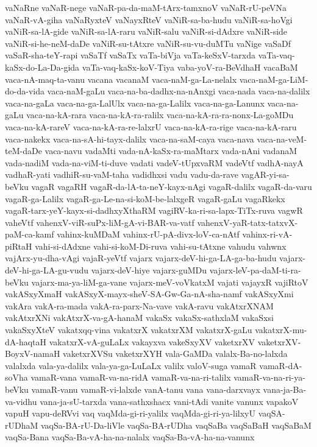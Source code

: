 {vaNaRne
vaNaR-nege
vaNaR-pa-da-maM-tArx-tamxnoV
vaNaR-rU-peVNa
vaNaR-vA-giha
vaNaRyxteV
vaNayxRteV
vaNiR-sa-ba-hudu
vaNiR-sa-hoVgi
vaNiR-sa-lA-gide
vaNiR-sa-lA-raru
vaNiR-salu
vaNiR-si-dAdxre
vaNiR-side
vaNiR-si-he-neM-daDe
vaNiR-su-tAtxre
vaNiR-su-vu-duMTu
vaNige
vaSaDf
vaSaR-sha-teY-rapi
vaSaTf
vaSaTx
vaTa-biVja
vaTa-keSxV-tarxda
vaTa-vaq-kaSx-do-La-Da-gida
vaTa-vaq-kaSx-koV-Tiya
vaba-yoV-ra-BeVdhaH
vacaBaM
vaca-nA-maq-ta-vanu
vacana
vacanaM
vaca-naM-ga-La-nelalx
vaca-naM-ga-LiM-do-da-vida
vaca-naM-gaLu
vaca-na-ba-dadhx-na-nAnxgi
vaca-nada
vaca-na-dalilx
vaca-na-gaLa
vaca-na-ga-LalUlx
vaca-na-ga-Lalilx
vaca-na-ga-Lanunx
vaca-na-gaLu
vaca-na-kA-rara
vaca-na-kA-ra-ralilx
vaca-na-kA-ra-ra-nonx-La-goMDu
vaca-na-kA-rareV
vaca-na-kA-ra-re-lalxrU
vaca-na-kA-ra-rige
vaca-na-kA-raru
vaca-nakekx
vaca-na-sA-hi-tayx-dalilx
vaca-na-saM-caya
vaca-nava
vaca-na-veM-teM-daDe
vaca-navu
vadaMti
vada-nA-kaSx-ra-maMtarx
vada-nAni
vadanaM
vada-nadiM
vada-na-viM-ti-duve
vadati
vadeV-tUpxvaRM
vadeVtf
vadhA-nayA
vadhaR-yati
vadhiR-su-vaM-taha
vadidhxsi
vadu
vadu-da-rave
vagAR-yi-sa-beVku
vagaR
vagaRH
vagaR-da-lA-ta-neY-kayx-nAgi
vagaR-dalilx
vagaR-da-varu
vagaR-ga-Lalilx
vagaR-ga-Le-na-si-koM-be-lalxgeR
vagaR-gaLu
vagaRkekx
vagaR-tarx-yeY-kayx-si-dadhxyXthaRM
vagiRV-ka-ri-sa-lapx-TiTx-ruva
vagwR
vaheVtf
vahenxV-viR-suPx-liM-gA-vi-BAR-va-vatf
vahenxV-yaR-tatx-tatxvX-paM-ca-kamf
vahinx-kuMDaM
vahinx-rU-pA-divx-loV-ca-nAtf
vahinx-ri-vA-piRtaH
vahi-si-dAdxne
vahi-si-koM-Di-ruva
vahi-su-tAtxne
vahudu
vahwnx
vajArx-yu-dha-vAgi
vajaR-yeVtf
vajarx
vajarx-deV-hi-ga-LA-ga-ba-hudu
vajarx-deV-hi-ga-LA-gu-vudu
vajarx-deV-hiye
vajarx-guMDu
vajarx-leV-pa-daM-ti-ra-beVku
vajarx-ma-ya-liM-ga-vane
vajarx-meV-voVkatxM
vajati
vajayxR
vajiRtoV
vakASxyXmaH
vakASxyX-mayx-sheV-SA-Gw-Ga-nA-sha-namf
vakASxyXmi
vakAra
vakA-ra-mada
vakA-ra-parx-Na-vave
vakA-ravu
vakAtxrXNAM
vakAtxrXNi
vakAtxrX-va-gA-hanaM
vakaSx
vakaSx-sathxlaM
vakaSxsi
vakaSxyXteV
vakatxqq-vina
vakatxrX
vakatxrXM
vakatxrX-gaLu
vakatxrX-mu-dA-haqtaH
vakatxrX-vA-guLaLx
vakayxva
vakeSxyXV
vaketxrXV
vaketxrXV-BoyxV-namaH
vaketxrXVSu
vaketxrXYH
vala-GaMDa
valalx-Ba-no-lalxda
valalxda
vala-ya-dalilx
vala-ya-ga-LuLaLx
valilx
valoV-suga
vamaR
vamaR-dA-soVha
vamaR-vana
vamaR-va-na-ridA
vamaR-va-na-ri-talilx
vamaR-va-na-ri-ya-beVku
vamaR-vanu
vamaR-vi-lalxde
vanA-tanu
vana
vana-darxvayx
vana-ja-Ba-va-vidhu
vana-ja-sU-tarxda
vana-sathxshacx
vani-tAdi
vanite
vanunx
vapakoV
vapuH
vapu-deRVvi
vaq
vaqMda-gi-ri-yalilx
vaqMda-gi-ri-ya-lilxyU
vaqSA-rUDhaM
vaqSa-BA-rU-Da-liVle
vaqSa-BA-rUDha
vaqSaBa
vaqSaBaH
vaqSaBaM
vaqSa-Bana
vaqSa-Ba-vA-ha-na-nalalx
vaqSa-Ba-vA-ha-na-vanunx
}
